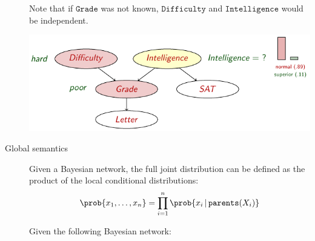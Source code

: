 \begin{description}
\begin{descriptionlist}
\begin{example}
                    Note that if $\texttt{Grade}$ was not known, 
                    $\texttt{Difficulty}$ and $\texttt{Intelligence}$ would be independent.
                    \begin{center}
                        \includegraphics[width=0.70\linewidth]{img/_explainaway_example.pdf}
                    \end{center}
                \end{example}
        \end{descriptionlist}

    \item[Global semantics] 
        Given a Bayesian network, the full joint distribution can be defined as
        the product of the local conditional distributions:
        \[ \prob{x_1, \dots, x_n} = \prod_{i=1}^{n} \prob{x_i \,\vert\, \texttt{parents}(X_i)} \]

        \begin{example}
            Given the following Bayesian network:


\end{example}
\end{description}
